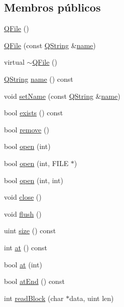 \subsection*{Membros públicos}
\begin{DoxyCompactItemize}
\item 
\hyperlink{class_q_file_ae6a34a36098fb5b72b5323c4f0f68c45}{Q\-File} ()
\item 
\hyperlink{class_q_file_a39dd51648a1253af940dda4c2dcc5af8}{Q\-File} (const \hyperlink{class_q_string}{Q\-String} \&\hyperlink{class_q_file_a2b0a198f837184bf6fff555cee3ce770}{name})
\item 
virtual \hyperlink{class_q_file_a0d368da936b18afad80e3718f2c01cd9}{$\sim$\-Q\-File} ()
\item 
\hyperlink{class_q_string}{Q\-String} \hyperlink{class_q_file_a2b0a198f837184bf6fff555cee3ce770}{name} () const 
\item 
void \hyperlink{class_q_file_ab01f7d9d65c3e6a6b7889a51ad2bb487}{set\-Name} (const \hyperlink{class_q_string}{Q\-String} \&\hyperlink{class_q_file_a2b0a198f837184bf6fff555cee3ce770}{name})
\item 
bool \hyperlink{class_q_file_a74bdced855aaba94868b77f21398775c}{exists} () const 
\item 
bool \hyperlink{class_q_file_a1f9c4a4bd47b7cd9beb431504c5ae46c}{remove} ()
\item 
bool \hyperlink{class_q_file_ae7331757d844e703f2f6e4727e454193}{open} (int)
\item 
bool \hyperlink{class_q_file_a36feb6e1cb706398ccbf7d679d07b17f}{open} (int, F\-I\-L\-E $\ast$)
\item 
bool \hyperlink{class_q_file_acd255abbaf23e5ab42dc4d6ce3558d3f}{open} (int, int)
\item 
void \hyperlink{class_q_file_a5ae591df94fc66ccb85cbb6565368bca}{close} ()
\item 
void \hyperlink{class_q_file_adac116554b543b7c4228c018a85882f5}{flush} ()
\item 
uint \hyperlink{class_q_file_a7e63723212bed1ca52f0fe57e58b812e}{size} () const 
\item 
int \hyperlink{class_q_file_a3bce8d0bb4d6fbaa012b9a61c3910907}{at} () const 
\item 
bool \hyperlink{class_q_file_afbf6dc03efea5d2f5098b8316a8a66b9}{at} (int)
\item 
bool \hyperlink{class_q_file_a11cbf4ba82ee565cb9eef28b972bf145}{at\-End} () const 
\item 
int \hyperlink{class_q_file_a728f540fa66b4fe748da2b637e2d72e1}{read\-Block} (char $\ast$data, uint len)

\end{DoxyCompactItemize}
